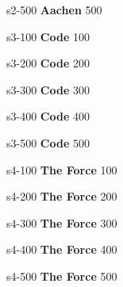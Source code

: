 \documentclass{beamer}
\def \secondcat {\textbf{Aachen}}
\def \thirdcat {\textbf{Code}}
\def \fourthcat {\textbf{The Force}}
\begin{document}
	
	\content                       
	{s2-500}                     
	{\secondcat}                          
	{500}{   

	}
	
	
	\content                       
	{s3-100}                     
	{\thirdcat}                          
	{100}{    

	}
	
	
	\content                       
	{s3-200}                     
	{\thirdcat}                          
	{200}{     
		       
	}
	
	
	\content           
	{s3-300}                     
	{\thirdcat}                          
	{300}{    
                  
	}
	
	
	\content                       
	{s3-400}                     
	{\thirdcat}                          
	{400}{     
 
	}
	
	
	\content                       
	{s3-500}                     
	{\thirdcat}                          
	{500}{  

	}
	
	
	\content                       
	{s4-100}                     
	{\fourthcat}                          
	{100}{    

	}
	
	
	\content                       
	{s4-200}                     
	{\fourthcat}                          
	{200}{        
	    
	}
	
	
	\content           
	{s4-300}                     
	{\fourthcat}                          
	{300}{    
	                  
	}
	
	
	\content                       
	{s4-400}                     
	{\fourthcat}                          
	{400}{    
	  
	}
	
	
	\content                       
	{s4-500}                     
	{\fourthcat}                          
	{500}{    
	  
	}
	
\end{document}
